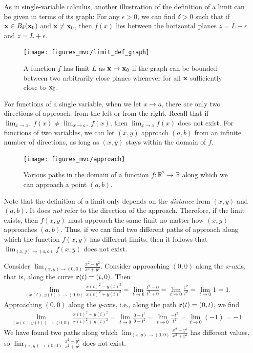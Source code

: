 \documentclass[12pt,letterpaper,reqno]{article}
\numberwithin{equation}{section}
\newcommand{\R}{\ensuremath{\mathbb R}}
\newcommand{\bx}{{\bf x}}
\newcommand{\bbr}{{\bf r}}
\begin{document}
{\newpage

As in single-variable calculus, another illustration of the definition of a limit can be given in terms of its graph: For any $\epsilon>0$, we can find $\delta>0$ such that if $\bx \in B_\delta(\bx_0)$ and $\bx \neq \bx_0$, then $f(x)$ lies between the horizontal planes $z=L-\epsilon$ and $z=L+\epsilon$.

	\begin{figure}[h]
		\begin{center}
	\texttt{[image: figures\_mvc/limit\_def\_graph]}
	\end{center}
	\caption{A function $f$ has limit $L$ as $\bx \to \bx_0$ if the graph can be bounded between two arbitrarily close planes whenever for all $\bx$ sufficiently close to $\bx_0$.}
	\end{figure}
	
For functions of a single variable, when we let $x \to a$, there are only two directions of approach: from the left or from the right. Recall that if $\lim_{x \to a^-}f(x) \neq \lim_{x \to a^+}f(x)$, then $\lim_{x \to a}f(x)$ does not exist. For functions of two variables, we can let $(x,y)$ approach $(a,b)$ from an infinite number of directions, as long as $(x,y)$ stays within the domain of $f$.
	
\begin{figure}[h]
	\begin{center}
		\texttt{[image: figures\_mvc/approach]}
	\end{center}
	\caption{Various paths in the domain of a function $f:\R^2 \to \R$ along which we can approach a point $(a,b)$.}
\end{figure}	
	
	
Note that the definition of a limit only depends on the \emph{distance} from $(x,y)$ and $(a,b)$. It does \emph{not} refer to the direction of the approach. Therefore, if the limit exists, then $f(x,y)$ must approach the same limit no matter how $(x,y)$ approaches $(a,b)$. Thus, if we can find two different paths of approach along which the function $f(x,y)$ has different limits, then it follows that $\lim_{(x,y) \to (a,b)}f(x,y)$ does not exist.

\begin{example}
Consider $\lim_{(x,y) \to (0,0)}\frac{x^2-y^2}{x^2+y^2}$. Consider approaching $(0,0)$ along the $x$-axis, that is, along the curve $\bbr(t)=(t,0)$. Then
\begin{align*}
	\lim_{(x(t),y(t)) \to (0,0)}\frac{x(t)^2-y(t)^2}{x(t)^2+y(t)^2}=\lim_{t \to 0}\frac{t^2-0}{t^2+0}=\lim_{t \to 0}\frac{t^2}{t^2}=\lim_{t \to 0}1=1.
\end{align*}
Approaching $(0,0)$ along the $y$-axis, i.e., along the path $\bbr(t)=(0,t)$, we find
	\begin{align*}
	\lim_{(x(t),y(t)) \to (0,0)}\frac{x(t)^2-y(t)^2}{x(t)^2+y(t)^2}=\lim_{t \to 0}\frac{0-t^2}{0+t^2}=\lim_{t \to 0}\frac{-t^2}{t^2}=\lim_{t \to 0}(-1)=-1.
\end{align*}
We have found two paths along which $\lim_{(x,y) \to (0,0)}\frac{x^2-y^2}{x^2+y^2}$ has different values, so $\lim_{(x,y) \to (0,0)}\frac{x^2-y^2}{x^2+y^2}$ does not exist.
\end{example}

}
\end{document}
